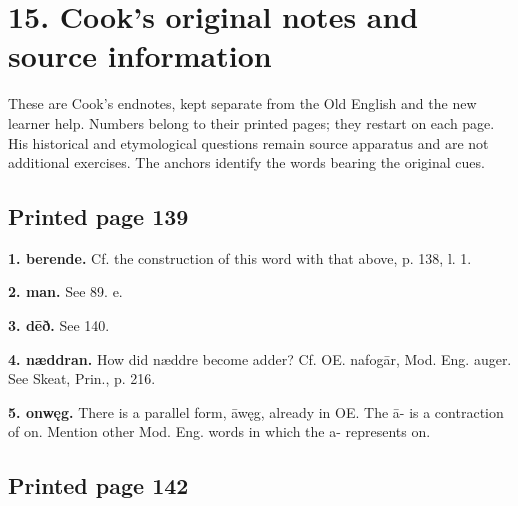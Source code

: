 \section*{15. Cook’s original notes and source information}

\begingroup\fontsize{10}{12.8}\selectfont
\setlength{\parskip}{1.5pt}
These are Cook’s endnotes, kept separate from the Old English and the new learner help. Numbers belong to their printed pages; they restart on each page. His historical and etymological questions remain source apparatus and are not additional exercises. The anchors identify the words bearing the original cues.

\subsection*{Printed page 139}

\textbf{1. berende.} Cf. the construction of this word with that above, p. 138, l. 1.

\textbf{2. man.} See 89. e.

\textbf{3. dēð.} See 140.

\textbf{4. næddran.} How did næddre become adder? Cf. OE. nafogār, Mod. Eng. auger. See Skeat, Prin., p. 216.

\textbf{5. onwęg.} There is a parallel form, āwęg, already in OE. The ā- is a contraction of on. Mention other Mod. Eng. words in which the a- represents on.

\subsection*{Printed page 142}

